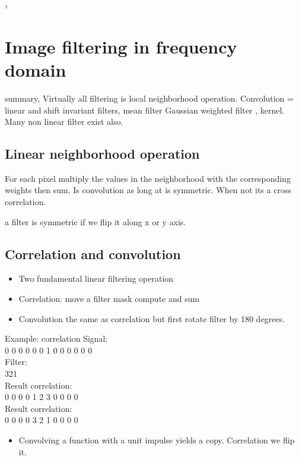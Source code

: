 ›

\section{Image filtering in frequency domain}

summary, Virtually all filtering is local neighborhood operation.
Convolution = linear and shift invariant filters, mean filter Gaussian weighted filter , kernel. 
Many non linear filter exist also. 

\subsection*{Linear neighborhood operation}
For each pixel multiply the values in the neighborhood with the corresponding weights then sum. Is convolution as long at is symmetric. When not its a cross correlation. 

a filter is symmetric if we flip it along x or y axis. 

\subsection*{Correlation and convolution}
 \begin{itemize}
 	\item Two fundamental linear filtering operation
 	\item Correlation: move a filter mask compute and sum
 	\item  Convolution the same as correlation but first rotate filter by 180 degrees.  
 \end{itemize}
 
 \begin{example}{Example: correlation}
 Signal: \\
 0 0 0 0 0 0 1 0 0 0 0 0 0 \\
 Filter: \\
 321 \\
 Result correlation: \\
 0 0 0 0 1 2 3 0 0 0 0 \\
 Result correlation: \\
 0 0 0 0 3 2 1 0 0 0 0 \\
 \begin{itemize}
 	\item Convolving a function with a unit impulse yields a copy. Correlation we flip it. 
 \end{itemize}
 
 \end{example}	



